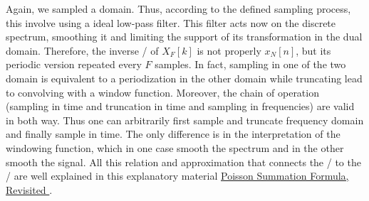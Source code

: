 \mynewline
Again, we sampled a domain. Thus, according to the defined sampling process, this involve using a ideal low-pass filter.
This filter acts now on the discrete spectrum, smoothing it and limiting the support of its transformation in the dual domain.
Therefore, the inverse \DFT/ of $X_F[k]$ is not properly $x_N[n]$, but its periodic version repeated every $F$ samples.
In fact, sampling in one of the two domain is equivalent to a periodization in the other domain while truncating lead to convolving with a window function.
Moreover, the chain of operation (sampling in time and truncation in time and sampling in frequencies) are valid in both way.
Thus one can arbitrarily first sample and truncate frequency domain and finally sample in time.
The only difference is in the interpretation of the windowing function, which in one case smooth the spectrum and in the other smooth the signal.
All this relation and approximation that connects the \FT/ to the \DFT/ are well explained in this explanatory material
{\href{https://krasjet.com/rnd.wlk/poisson.pdf}{Poisson Summation Formula, Revisited \ExternalLink}}.


